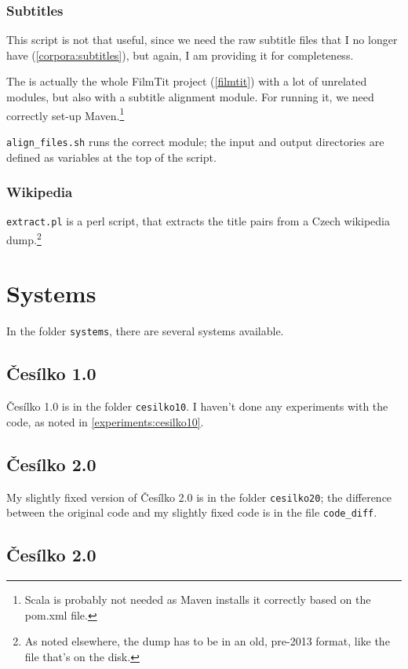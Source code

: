 \subsubsection{Subtitles}
This script is not that useful, since we need the raw subtitle files that I no longer have (\ref{corpora:subtitles}), but again, I am providing it for completeness.

The  is actually the whole FilmTit project (\ref{filmtit}) with a lot of unrelated modules, but also with a subtitle alignment module. For running it, we need correctly set-up Maven.\footnote{Scala is probably not needed as Maven installs it correctly based on the pom.xml file.} 

\texttt{align\_files.sh} runs the correct module; the input and output directories are defined as variables at the top of the script.

\subsubsection{Wikipedia}
\texttt{extract.pl} is a perl script, that extracts the title pairs from a Czech wikipedia dump.\footnote{As noted elsewhere, the dump has to be in an old, pre-2013 format, like the file that's on the disk.}

\section{Systems}
In the folder \texttt{systems}, there are several systems available.
\subsection{Česílko 1.0}
Česílko 1.0 is in the folder \texttt{cesilko10}. I haven't done any experiments with the code, as noted in \ref{experiments:cesilko10}.

\subsection{Česílko 2.0}
My slightly fixed version of Česílko 2.0 is in the folder \texttt{cesilko20}; the difference between the original code and my slightly fixed code is in the file \texttt{code\_diff}.


\subsection{Česílko 2.0}







